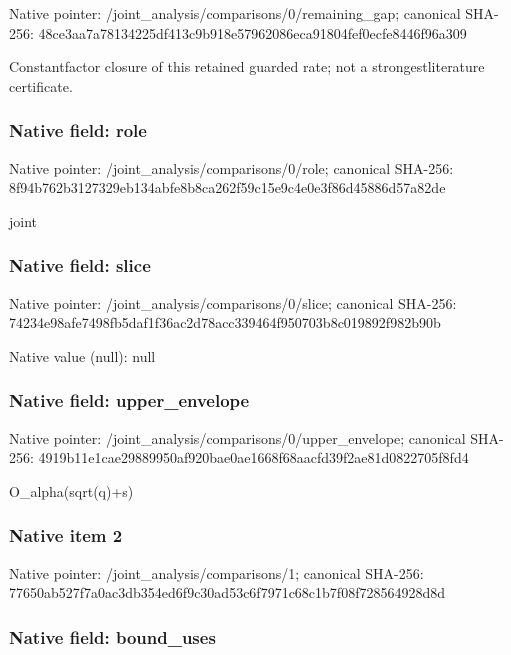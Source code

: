 \documentclass[10pt,a4paper]{article}
\begin{document}
Native pointer: /joint\_analysis/comparis\allowbreak{}ons/0/remaining\_gap; canonical SHA-256: 48ce3aa7a78134225df413c9\allowbreak{}b918e57962086eca91804fef\allowbreak{}0ecfe8446f96a309


Constantfactor closure of this retained guarded rate; not a strongestliterature certificate.


\subsubsection{Native field: role}


Native pointer: /joint\_analysis/comparisons/0/role; canonical SHA-256: 8f94b762b3127329eb134abf\allowbreak{}e8b8ca262f59c15e9c4e0e3f\allowbreak{}86d45886d57a82de


joint


\subsubsection{Native field: slice}


Native pointer: /joint\_analysis/comparisons/0/slice; canonical SHA-256: 74234e98afe7498fb5daf1f3\allowbreak{}6ac2d78acc339464f950703b\allowbreak{}8c019892f982b90b



Native value (null): null



\subsubsection{Native field: upper\_envelope}


Native pointer: /joint\_analysis/comparis\allowbreak{}ons/0/upper\_envelope; canonical SHA-256: 4919b11e1cae29889950af92\allowbreak{}0bae0ae1668f68aacfd39f2a\allowbreak{}e81d0822705f8fd4


O\_alpha(sqrt(q)+s)


\subsubsection{Native item 2}


Native pointer: /joint\_analysis/comparisons/1; canonical SHA-256: 77650ab527f7a0ac3db354ed\allowbreak{}6f9c30ad53c6f7971c68c1b7\allowbreak{}f08f728564928d8d



\subsubsection{Native field: bound\_uses}
\end{document}

